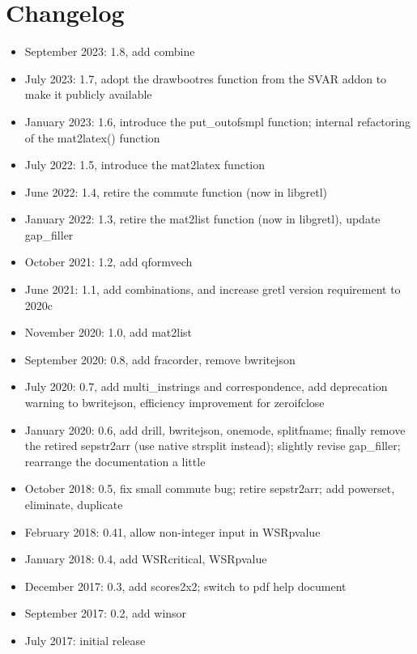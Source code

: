 \documentclass[11pt,english]{article}
\begin{document}
\section{Changelog }
\begin{itemize}
\item September 2023: 1.8, add combine
\item July 2023: 1.7, adopt the drawbootres function from the SVAR addon 
  to make it publicly available  
\item January 2023: 1.6, introduce the put\_outofsmpl function; internal
  refactoring of the mat2latex() function
\item July 2022: 1.5, introduce the mat2latex function
\item June 2022: 1.4, retire the commute function (now in libgretl)
\item January 2022: 1.3, retire the mat2list function (now in
  libgretl), update gap\_filler
\item October 2021: 1.2, add qformvech
\item June 2021: 1.1, add combinations, and increase gretl version requirement
  to 2020c
\item November 2020: 1.0, add mat2list
\item September 2020: 0.8, add fracorder, remove bwritejson
\item July 2020: 0.7, add multi\_instrings and correspondence, add deprecation
  warning to bwritejson, efficiency improvement for zeroifclose
\item January 2020: 0.6, add drill, bwritejson, onemode, splitfname;
  finally remove the retired sepstr2arr (use native strsplit instead);
  slightly revise gap\_filler; rearrange the documentation a little
\item October 2018: 0.5, fix small commute bug; retire sepstr2arr; add 
  powerset, eliminate, duplicate
\item February 2018: 0.41, allow non-integer input in WSRpvalue
\item January 2018: 0.4, add WSRcritical, WSRpvalue
\item December 2017: 0.3, add scores2x2; switch to pdf help document
\item September 2017: 0.2, add winsor
\item July 2017: initial release
\end{itemize}
\end{document}
